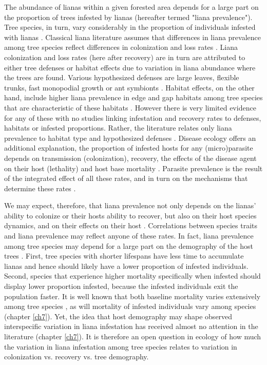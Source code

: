 \documentclass[b5paper,justified]{tufte-book} %
\begin{document}
\begin{fullwidth}
The abundance of lianas within a given forested area depends for a large part on the proportion of trees infested by lianas (hereafter termed "liana prevalence"). Tree species, in turn, vary considerably in the proportion of individuals infested with lianas \citep{Clark1990}. Classical liana literature assumes that differences in liana prevalence among tree species reflect differences in colonization and loss rates \citep{Heijden2008}. Liana colonization and loss rates (here after recovery) are in turn are attributed to either tree defenses or habitat effects due to variation in liana abundance where the trees are found.  Various hypothesized defenses are large leaves, flexible trunks, fast monopodial growth or ant symbionts \citep{Putz1980,Putz1984,Putz1984a, Hegarty1989}. Habitat effects, on the other hand, include higher liana prevalence in edge and gap habitats among tree species that are characteristic of these habitats \citep{Putz1984a}. However there is very limited evidence for any of these with no studies linking infestation and recovery rates to defenses, habitats or infested proportions. Rather, the literature relates only liana prevalence to habitat type and hypothesized defenses \citep{Putz1984,Putz1984a, Clark1990}. Disease ecology offers an additional explanation, the proportion of infested hosts for any (micro)parasite depends on transmission (colonization), recovery, the effects of the disease agent on their host (lethality) and host base mortality \citep{Anderson1982}. Parasite prevalence is the result of the integrated effect of all these rates, and in turn on the mechanisms that determine these rates \citep[e.g.][]{Roberts2009}. 

We may expect, therefore, that liana prevalence not only depends on the lianas' ability to colonize or their hosts ability to recover, but also on their host species dynamics, and on their effects on their host \citep[lethality;][]{Anderson1982,  Holt2007}. Correlations between species traits and liana prevalence may reflect anyone of these rates. In fact, liana prevalence among tree species may depend for a large part on the demography of the host trees \citep{Muller-Landau2016}. First, tree species with shorter lifespans have less time to accumulate lianas and hence should likely have a lower proportion of infested individuals. Second, species that experience higher mortality specifically when infested should display lower proportion infested, because the infested individuals exit the population faster.  It is well known that both baseline mortality varies extensively among tree species \citep[e.g.][]{Condit2006}, as will mortality of infested individuals vary among species (chapter \ref{ch7}). Yet, the idea that host demography may shape observed interspecific variation in liana infestation has received almost no attention in the literature (chapter \ref{ch7}).  It is therefore an open question in ecology of how much the variation in liana infestation among tree species relates to variation in colonization vs. recovery vs. tree demography.


\end{fullwidth}
\end{document}
